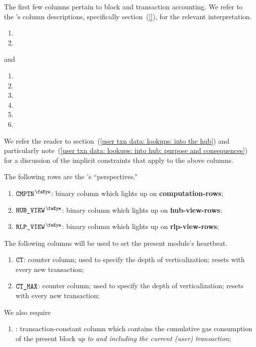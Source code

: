 The first few columns pertain to block and transaction accounting.
We refer to the \hubMod{}'s column descriptions,
specifically section~(\ref{}),
for the relevant interpretation.
\begin{multicols}{3}
	\begin{enumerate}
		\item \blockNumber
		\item \totalTransactionNumber
	\end{enumerate}
\end{multicols}
\noindent and
\begin{multicols}{2}
	\begin{enumerate}[resume]
		\item \sysi
		\item \user
		\item \sysf
		\item \sysiTransactionNumber
		\item \userTransactionNumber
		\item \sysfTransactionNumber
	\end{enumerate}
\end{multicols}
\noindent We refer the reader to
section~(\ref{user txn data: lookups: into the hub}) and particularly
note~(\ref{user txn data: lookups: into hub: purpose and consequences})
for a discussion of the implicit constraints that apply to the above columns.

The following rows are the \userTxnDataMod{}'s ``perspectives.''
\begin{enumerate}[resume]
	\item
		$\isUserTxnComputation$:
		binary column which lights up on \textbf{computation-rows};
	\item
		$\isUserTxnHubView$:
		binary column which lights up on \textbf{hub-view-rows};
	\item
		$\isUserTxnRlpView$:
		binary column which lights up on \textbf{rlp-view-rows};
\end{enumerate}
The following columns will be used to set the present module's heartbeat.
\begin{enumerate}[resume]
	\item $\texttt{CT}$:
		counter column;
		used to specify the depth of verticalization;
		resets with every new transaction; 
	\item $\texttt{CT\_MAX}$:
		counter column;
		used to specify the depth of verticalization;
		resets with every new transaction; 
\end{enumerate}
We also require
\begin{enumerate}[resume]
	\item \cumulativeConsumedGas:
		transaction-constant column which contains the cumulative gas consumption of the present block
		\emph{up to and including the current (user) transaction};
\end{enumerate}

